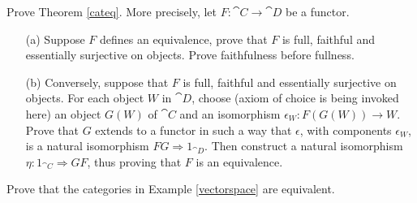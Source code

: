 \vspace{0.1in}

\begin{problem}\label{prob 3.4}
Prove Theorem \ref{cateq}. More precisely, let $F:\cat{C} \to \cat{D}$ be a functor. 
\begin{itemize}
\item[(a)] Suppose $F$ defines an equivalence, prove that $F$ is full, faithful and essentially surjective on objects. Prove faithfulness before fullness.
\item[(b)] Conversely, suppose that $F$ is full, faithful and essentially surjective on objects. For each object $W$ in $\cat{D}$, choose (axiom of choice is being invoked here) an object $G(W)$ of $\cat{C}$ and an isomorphism $\epsilon_W: F(G(W)) \to W$. Prove that $G$ extends to a functor in such a way that $\epsilon$, with components $\epsilon_W$, is a natural isomorphism $FG \Rightarrow 1_{\cat{D}}$. Then construct a natural isomorphism $\eta:1_{\cat{C}} \Rightarrow GF$, thus proving that $F$ is an equivalence. 
\end{itemize}
\end{problem}

\vspace{0.1in}

\begin{problem}\label{prob 3.5}
Prove that the categories in Example \ref{vectorspace} are equivalent. 
\end{problem}

\vspace{0.1in}

